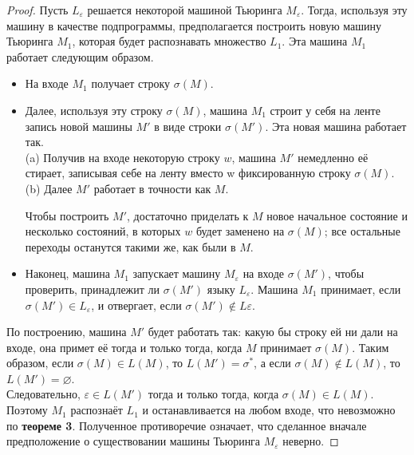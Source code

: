 \documentclass[a4paper]{article}
\theoremstyle{indented}
\theoremstyle{definition}
\theoremstyle{remark}
\begin{document}
\begin{proof}
    Пусть $L_\varepsilon$ решается некоторой машиной Тьюринга $M_\varepsilon$. Тогда, используя эту машину в качестве подпрограммы, предполагается построить новую машину Тьюринга $M_1$, которая будет распознавать множество $L_1$. Эта машина $M_1$ работает следующим образом.

    \begin{itemize}
        \item На входе $M_1$ получает строку $\sigma(M)$.
        \item Далее, используя эту строку $\sigma(M)$, машина $M_1$ строит у себя на ленте запись новой машины $M'$ в виде строки $\sigma(M')$. Эта новая машина работает так. \\ 

            (a) Получив на входе некоторую строку $w$, машина $M'$ немедленно её стирает, записывая себе на ленту вместо w фиксированную строку $\sigma(M)$. \\ 

            (b) Далее $M'$ работает в точности как $M$.

            Чтобы построить $M'$, достаточно приделать к $M$ новое начальное состояние и несколько состояний, в которых $w$ будет заменено на $\sigma(M)$; все остальные переходы останутся такими же, как были в $M$.

        \item Наконец, машина $M_1$ запускает машину $M_\varepsilon$ на входе $\sigma(M')$, чтобы проверить, принадлежит ли $\sigma(M')$ языку $L_\varepsilon$. Машина $M_1$ принимает, если $\sigma(M') \in L_\varepsilon$, и отвергает, если $\sigma(M') \notin L\varepsilon$.
    \end{itemize}

По построению, машина $M'$ будет работать так: какую бы строку ей ни дали на входе, она примет её тогда и только тогда, когда $M$ принимает $\sigma(M)$. Таким образом, если $\sigma(M) \in L(M)$, то $L(M') = \sigma^*$, а если $\sigma(M) \notin L(M)$, то $L(M') = \varnothing$. \\ 

Следовательно, $\varepsilon \in L(M')$ тогда и только тогда, когда $\sigma(M) \in L(M)$. Поэтому $M_1$ распознаёт $L_1$ и останавливается на любом входе, что невозможно по \textbf{теореме 3}. Полученное противоречие означает, что сделанное вначале предположение о существовании машины Тьюринга $M_\varepsilon$ неверно.
\end{proof}
\end{document}
